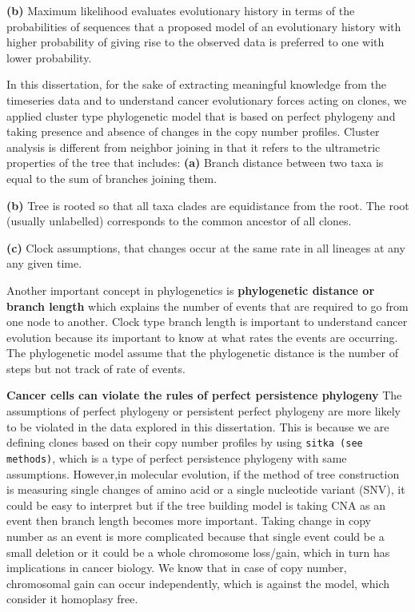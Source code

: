 \textbf{(b)} Maximum likelihood evaluates evolutionary history in terms of the probabilities of sequences that a proposed model of an evolutionary history with higher probability of giving rise to the observed data is preferred to one with lower probability. 


In this dissertation, for the sake of extracting meaningful knowledge from the timeseries data and to understand cancer evolutionary forces acting on clones, we applied cluster type phylogenetic model that is based on perfect phylogeny and taking presence and absence of changes in the copy number profiles. 
Cluster analysis is different from neighbor joining in that it refers to the ultrametric properties of the tree that includes:
\textbf{(a)} Branch distance between two taxa is equal to the sum of branches joining them.

\textbf{(b)} Tree is rooted so that all taxa clades are equidistance from the root. The root (usually unlabelled) corresponds to the common ancestor of all clones.

\textbf{(c)} Clock assumptions, that changes occur at the same rate in all lineages at any any given time.

Another important concept in phylogenetics is \textbf{phylogenetic distance or branch length} which explains the number of events that are required to go from one node to another. Clock type branch length is important to understand cancer evolution because its important to know at what rates the events are occurring. The phylogenetic model assume that the phylogenetic distance is the number of steps but not track of rate of events.

\textbf{Cancer cells can violate the rules of perfect persistence phylogeny}
 The assumptions of perfect phylogeny or persistent perfect phylogeny are more likely to be violated in the data explored in this dissertation. This is because we are defining clones based on their copy number profiles by using \texttt{sitka (see methods)}, which is a type of perfect persistence phylogeny with same assumptions. However,in molecular evolution, if the method of tree construction is measuring single changes of amino acid or a single nucleotide variant (SNV), it could be easy to interpret but if the tree building model is taking CNA as an event then branch length becomes more important. Taking change in copy number as an event is more complicated because that single event could be a small deletion or it could be a whole chromosome loss/gain, which in turn has implications in cancer biology. We know that in case of copy number, chromosomal gain can occur independently, which is against the model, which consider it homoplasy free.

